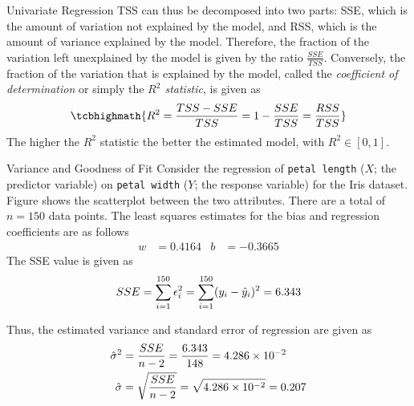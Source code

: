 \begin{frame}{Univariate Regression}
TSS can thus be decomposed into two parts: SSE, which is the
amount of variation not explained by the model, 
and RSS, which is the amount of variance explained
by the model.
Therefore, the fraction of the variation left unexplained by the model is given
by the ratio $\frac{SSE}{TSS}$. 
Conversely, the fraction of the
variation that is explained by the model, called the {\em coefficient
of determination} or simply the {\em $R^2$ statistic}, is given as
\begin{align}
    \tcbhighmath{
    R^2 = \frac{TSS - SSE}{TSS} = 1 - \frac{SSE}{TSS} = \frac{RSS}{TSS}}
    \label{eq:reg:eval:r2_rss}
\end{align}
The higher the $R^2$ statistic the better the estimated model, with $R^2 \in
[0,1]$.
\end{frame}
%
\begin{frame}{Variance and Goodness of Fit}
   Consider %
the
   regression of {\tt petal length} ($X$; the predictor variable) on 
    {\tt petal width} ($Y$; the response variable) for the
   Iris dataset.
Figure shows the scatterplot between
    the two attributes.  There are a total of $n=150$ data points.
    The least squares estimates for the bias and regression coefficients
    are as follows
    \begin{align*}
        w & = 0.4164 & b & = -0.3665
    \end{align*}
    The SSE value is given as
    \begin{align*}
        SSE = \sum_{i=1}^{150} \epsilon_i^2 
        = \sum_{i=1}^{150} (y_i - \hat{y}_i)^2 = 6.343
    \end{align*}
    
    Thus, the estimated variance and standard error of regression are given as
    \begin{align*}
        \hat{\sigma}^2 & = \frac{SSE}{n-2} = \frac{6.343}{148} = 4.286 \times 10^{-2}\\
        \hat{\sigma} & = \sqrt{\frac{SSE}{n-2}} = \sqrt{4.286 \times 10^{-2}} = 0.207
    \end{align*}
\end{frame}
    
